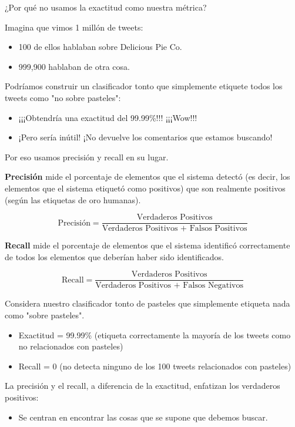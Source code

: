 ¿Por qué no usamos la exactitud como nuestra métrica?

Imagina que vimos 1 millón de tweets:
\begin{itemize}
\item 100 de ellos hablaban sobre Delicious Pie Co.
\item 999,900 hablaban de otra cosa.
\end{itemize}

Podríamos construir un clasificador tonto que simplemente etiquete todos los tweets como "no sobre pasteles":
\begin{itemize}
\item ¡¡¡Obtendría una exactitud del 99.99\%!!! ¡¡¡Wow!!!
\item ¡Pero sería inútil! ¡No devuelve los comentarios que estamos buscando!
\end{itemize}

Por eso usamos precisión y recall en su lugar.


\textbf{Precisión} mide el porcentaje de elementos que el sistema detectó (es decir, los elementos que el sistema etiquetó como positivos) que son realmente positivos (según las etiquetas de oro humanas).

\[
\text{Precisión} = \frac{\text{Verdaderos Positivos}}{\text{Verdaderos Positivos + Falsos Positivos}}
\]

\textbf{Recall} mide el porcentaje de elementos que el sistema identificó correctamente de todos los elementos que deberían haber sido identificados.

\[
\text{Recall} = \frac{\text{Verdaderos Positivos}}{\text{Verdaderos Positivos + Falsos Negativos}}
\]


Considera nuestro clasificador tonto de pasteles que simplemente etiqueta nada como "sobre pasteles".

\begin{itemize}
  \item Exactitud = 99.99\% (etiqueta correctamente la mayoría de los tweets como no relacionados con pasteles)
  \item Recall = 0 (no detecta ninguno de los 100 tweets relacionados con pasteles)
\end{itemize}

La precisión y el recall, a diferencia de la exactitud, enfatizan los verdaderos positivos:
\begin{itemize}
  \item Se centran en encontrar las cosas que se supone que debemos buscar.
\end{itemize}

